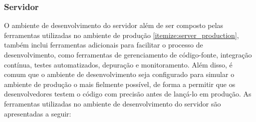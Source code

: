 \subsubsection{Servidor}

O ambiente de desenvolvimento do servidor além de ser composto pelas ferramentas utilizadas no ambiente de produção \ref{itemize:server_production}, também inclui ferramentas adicionais para facilitar o processo de desenvolvimento, como ferramentas de gerenciamento de código-fonte, integração contínua, testes automatizados, depuração e monitoramento. Além disso, é comum que o ambiente de desenvolvimento seja configurado para simular o ambiente de produção o mais fielmente possível, de forma a permitir que os desenvolvedores testem o código com precisão antes de lançá-lo em produção. As ferramentas utilizadas no ambiente de desenvolvimento do servidor são apresentadas a seguir:


